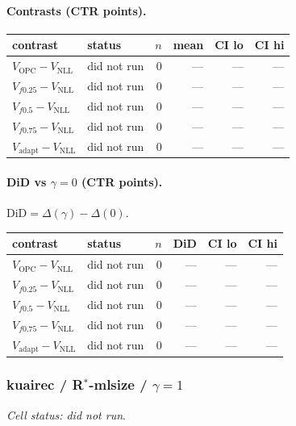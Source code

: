 \documentclass[10pt,a4paper]{article}
\begin{document}
\paragraph{Contrasts (CTR points).}
{\centering\small\begin{tabular}{llrrrr}
\toprule contrast & status & $n$ & mean & CI lo & CI hi \\
\midrule
$V_{\mathrm{OPC}}-V_{\mathrm{NLL}}$ & did not run & 0 & --- & --- & --- \\
$V_{f0.25}-V_{\mathrm{NLL}}$ & did not run & 0 & --- & --- & --- \\
$V_{f0.5}-V_{\mathrm{NLL}}$ & did not run & 0 & --- & --- & --- \\
$V_{f0.75}-V_{\mathrm{NLL}}$ & did not run & 0 & --- & --- & --- \\
$V_{\mathrm{adapt}}-V_{\mathrm{NLL}}$ & did not run & 0 & --- & --- & --- \\
\bottomrule\end{tabular}\par}
\paragraph{DiD vs $\gamma=0$ (CTR points).} $\mathrm{DiD}=\Delta(\gamma)-\Delta(0)$.
{\centering\small\begin{tabular}{llrrrr}
\toprule contrast & status & $n$ & DiD & CI lo & CI hi \\
\midrule
$V_{\mathrm{OPC}}-V_{\mathrm{NLL}}$ & did not run & 0 & --- & --- & --- \\
$V_{f0.25}-V_{\mathrm{NLL}}$ & did not run & 0 & --- & --- & --- \\
$V_{f0.5}-V_{\mathrm{NLL}}$ & did not run & 0 & --- & --- & --- \\
$V_{f0.75}-V_{\mathrm{NLL}}$ & did not run & 0 & --- & --- & --- \\
$V_{\mathrm{adapt}}-V_{\mathrm{NLL}}$ & did not run & 0 & --- & --- & --- \\
\bottomrule\end{tabular}\par}
\bigskip
\subsubsection{kuairec / R$^*$-mlsize / $\gamma=1$}
\emph{Cell status: did not run}.
\end{document}
